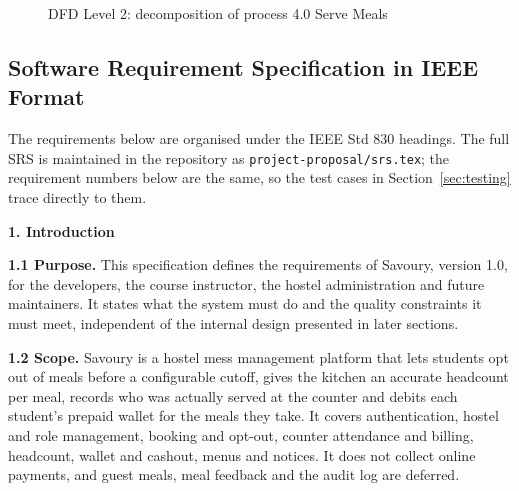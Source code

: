 \documentclass[11pt,a4paper]{article}
\begin{document}
\begin{figure}[H]
{}
\caption{DFD Level 2: decomposition of process 4.0 Serve Meals}
\label{fig:dfd2}
\end{figure}

\subsection{Software Requirement Specification in IEEE Format}

The requirements below are organised under the IEEE Std 830 headings. The full SRS is maintained in the repository as
\texttt{project-proposal/srs.tex}; the requirement numbers below are the same,
so the test cases in Section~\ref{sec:testing} trace directly to them.

\textbf{1. Introduction}

\textbf{1.1 Purpose.} This specification defines the requirements of Savoury,
version 1.0, for the developers, the course instructor, the hostel
administration and future maintainers. It states what the system must do and
the quality constraints it must meet, independent of the internal design
presented in later sections.

\textbf{1.2 Scope.} Savoury is a hostel mess management platform that lets
students opt out of meals before a configurable cutoff, gives the kitchen an
accurate headcount per meal, records who was actually served at the counter and
debits each student's prepaid wallet for the meals they take. It covers
authentication, hostel and role management, booking and opt-out, counter
attendance and billing, headcount, wallet and cashout, menus and notices. It
does not collect online payments, and guest meals, meal feedback and the audit
log are deferred.
\end{document}
